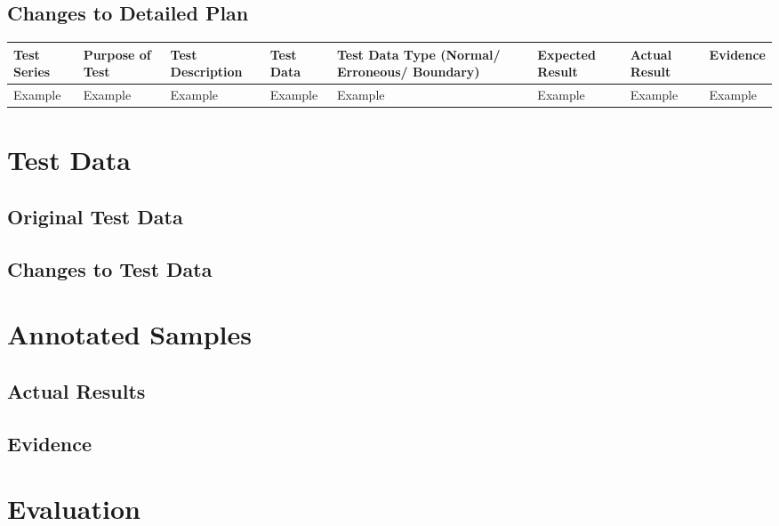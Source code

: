\begin{landscape}
\subsection{Changes to Detailed Plan}

\begin{center}
    \begin{longtable}{|p{1.5cm}|p{2.5cm}|p{2.5cm}|p{2cm}|p{2cm}|p{2cm}|p{2cm}|p{2cm}|}
        \hline
        \textbf{Test Series} & \textbf{Purpose of Test} & \textbf{Test Description} & \textbf{Test Data} & \textbf{Test Data Type (Normal/ Erroneous/ Boundary)} & \textbf{Expected Result} & \textbf{Actual Result} & \textbf{Evidence}\\ \hline
        Example & Example & Example & Example & Example & Example & Example & Example \\ \hline
    \end{longtable}
\end{center}

\section{Test Data}

\subsection{Original Test Data}

\subsection{Changes to Test Data}

\section{Annotated Samples}

\subsection{Actual Results}

\subsection{Evidence}

\end{landscape}

\section{Evaluation}

